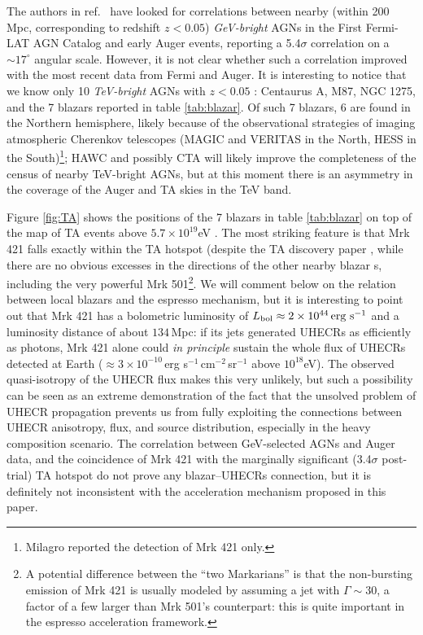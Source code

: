 \documentclass[3p,times,twocolumn]{elsarticle}
\newcommand{\cmq}{\,cm$^{-2}$}
\newcommand{\s}{\,s$^{-1}$}
\newcommand{\ergs}{\mbox{\,erg\,\s}}
\renewcommand{\deg}{^{\circ}}
\begin{document}
The authors in ref.\ \cite{nemmen+10} have looked for correlations between nearby (within 200\,Mpc, corresponding to redshift $z<0.05$) \emph{GeV-bright} AGNs in the First Fermi-LAT AGN Catalog \cite[1LAC, ][]{1LAC} and early Auger events, reporting a 5.4$\sigma$ correlation on a $\sim 17 \deg$ angular scale. However, it is not clear whether such a correlation improved with the most recent data from Fermi and Auger.
It is interesting to notice that we know only 10 \emph{TeV-bright} AGNs with $z<0.05$ \cite{TeVCat}: Centaurus A, M87, NGC 1275, and the 7 blazars reported in table \ref{tab:blazar}.
Of such 7 blazars, 6 are found in the Northern hemisphere, likely because of the observational strategies of imaging atmospheric Cherenkov telescopes (MAGIC and VERITAS in the North, HESS in the South)\footnote{Milagro reported the detection of Mrk 421 only.}; HAWC and possibly CTA will likely improve the completeness of the census of nearby TeV-bright AGNs, but at this moment there is an asymmetry in the  coverage of the Auger and TA skies in the TeV band. 

Figure \ref{fig:TA} shows the positions of the 7 blazars in table \ref{tab:blazar} on top of the map of TA events above $5.7\times 10^{19}$eV \cite{TAhotspot}.
The most striking feature is that Mrk 421 falls exactly within the TA hotspot (despite the TA discovery paper , while there are no obvious excesses in the directions of the other nearby blazar     s, including the very powerful Mrk 501\footnote{A potential difference between the ``two Markarians'' is that the non-bursting  emission of Mrk 421 is usually modeled by assuming a jet with $\Gamma\sim 30$, a factor of a few larger than Mrk 501's counterpart: this is quite important in the espresso acceleration framework.}. 
We will comment below on the relation between local blazars and the espresso mechanism, but it is interesting to point out that Mrk 421 has a bolometric luminosity of $L_{\rm bol}\approx 2\times 10^{44}\ergs$ and a luminosity distance of about $134$\,Mpc: if its jets generated UHECRs as efficiently as photons, Mrk 421 alone could \emph{in principle} sustain the whole flux of UHECRs detected at Earth ($\approx 3\times 10^{-10}$\ergs\cmq\,sr$^{-1}$ above $10^{18}$eV).
The observed quasi-isotropy of the UHECR flux makes this very unlikely, but such a possibility can be seen as an extreme demonstration of the fact that the unsolved problem of UHECR propagation prevents us from fully exploiting the connections between UHECR anisotropy, flux, and source distribution, especially in the heavy composition scenario.
The correlation between GeV-selected AGNs and Auger data, and the coincidence of Mrk 421 with the marginally significant (3.4$\sigma$ post-trial) TA hotspot do not prove any blazar--UHECRs connection, but it is definitely not inconsistent with the acceleration mechanism proposed in this paper.
\end{document}
